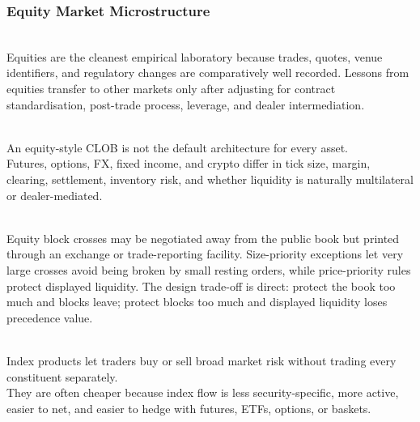 \subsubsection{Equity Market Microstructure}

\begin{principle} \\
Equities are the cleanest empirical laboratory because trades, quotes, venue identifiers, and regulatory changes are comparatively well recorded. Lessons from equities transfer to other markets only after adjusting for contract standardisation, post-trade process, leverage, and dealer intermediation.
\end{principle}

\begin{caveat} \\
An equity-style CLOB is not the default architecture for every asset.\\
Futures, options, FX, fixed income, and crypto differ in tick size, margin, clearing, settlement, inventory risk, and whether liquidity is naturally multilateral or dealer-mediated.
\end{caveat}

\begin{marketrule} \\
Equity block crosses may be negotiated away from the public book but printed through an exchange or trade-reporting facility. Size-priority exceptions let very large crosses avoid being broken by small resting orders, while price-priority rules protect displayed liquidity. The design trade-off is direct: protect the book too much and blocks leave; protect blocks too much and displayed liquidity loses precedence value.
\end{marketrule}

\begin{principle} \\
Index products let traders buy or sell broad market risk without trading every constituent separately.\\
They are often cheaper because index flow is less security-specific, more active, easier to net, and easier to hedge with futures, ETFs, options, or baskets.
\end{principle}

